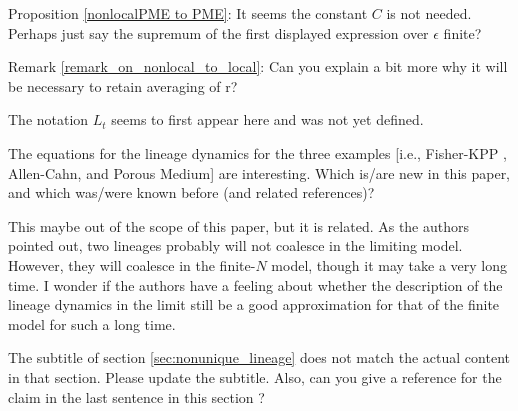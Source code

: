 \begin{point}{}
Proposition \ref{nonlocalPME to PME}:
    It seems the constant $C$ is not needed. Perhaps just say the supremum
of the first displayed expression over $\epsilon$ finite?
\end{point}

\reply{
}

\begin{point}{}
Remark \ref{remark_on_nonlocal_to_local}: Can you explain a bit more why it will be necessary to retain averaging of r?
\end{point}


\begin{point}{\revref}
The notation $L_t$ seems to first appear here and was not yet defined.
\end{point}


\begin{point}{}
    The equations for the lineage dynamics for the three examples [i.e., Fisher-KPP \revref, Allen-Cahn, and Porous Medium] are interesting.
Which is/are new in this paper, and which was/were known before (and related references)?
\end{point}


\begin{point}{}
This maybe out of the scope of this paper, but it is related. As the authors pointed out, two
lineages probably will not coalesce in the limiting model. However, they will coalesce in
the finite-$N$ model, though it may take a very long time. I wonder if the authors have a
feeling about whether the description of the lineage dynamics in the limit still be a good
approximation for that of the finite model for such a long time.
\end{point}


\begin{point}{}
The subtitle of section \ref{sec:nonunique_lineage} does not match the actual content in that section. Please
update the subtitle. Also, can you give a reference for the claim in the last sentence in this
section \revref?
\end{point}

